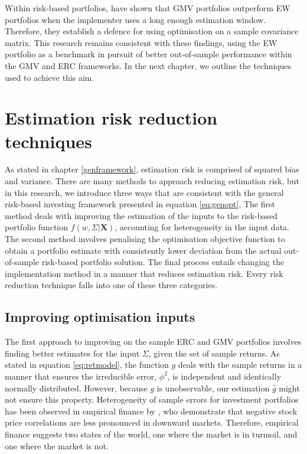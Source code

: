 \documentclass[
]{article}
\begin{document}
Within risk-based portfolios, \citet{K10} have shown that GMV portfolios outperform EW portfolios when the
implementer uses a long enough estimation window. Therefore, they establish a defence for using
optimisation on a sample covariance matrix. This research remains consistent with these findings,
using the EW portfolio as a benchmark in pursuit of better out-of-sample performance within the GMV
and ERC frameworks. In the next chapter, we outline the techniques used to achieve this aim.

\hypertarget{estimation-risk-reduction-techniques}{%
\section{Estimation risk reduction techniques}\label{estimation-risk-reduction-techniques}}

As stated in chapter \ref{genframework}, estimation risk is comprised of squared bias and variance.
There are many methods to approach reducing estimation risk, but in this research, we introduce three
ways that are consistent with the general risk-based investing framework presented in equation
\eqref{eq:genopt}. The first method deals with improving the estimation of the inputs to the risk-based
portfolio function \(f(w, \Sigma|\textbf{X})\), accounting for heterogeneity in the input data. The
second method involves penalising the optimisation objective function to obtain a portfolio estimate
with consistently lower deviation from the actual out-of-sample risk-based portfolio solution. The
final process entails changing the implementation method in a manner that reduces estimation risk.
Every risk reduction technique falls into one of these three categories.

\hypertarget{improving-optimisation-inputs}{%
\subsection{Improving optimisation inputs}\label{improving-optimisation-inputs}}

The first approach to improving on the sample ERC and GMV portfolios involves finding better estimates
for the input \(\Sigma\), given the set of sample returns. As stated in equation \eqref{eq:retmodel},
the function \(g\) deals with the sample returns in a manner that ensures the irreducible error,
\(\phi^2\), is independent and identically normally distributed. However, because \(g\) is unobservable,
our estimation \(\hat{g}\) might not ensure this property. Heterogeneity of sample errors for investment
portfolios has been observed in empirical finance by \citet{AC02}, who demonstrate that negative stock
price correlations are less pronounced in downward markets. Therefore, empirical finance suggests two
states of the world, one where the market is in turmoil, and one where the market is not.
\end{document}
